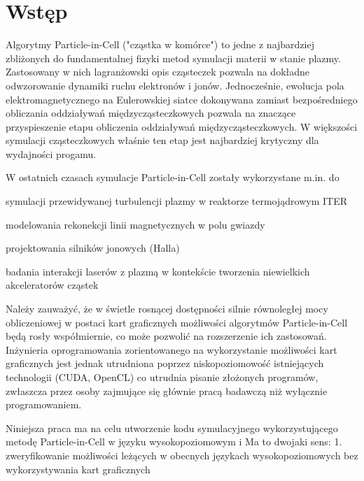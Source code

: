 \section{Wstęp} %
Algorytmy Particle-in-Cell ("cząstka w komórce") to jedne z najbardziej zbliżonych do fundamentalnej fizyki
metod symulacji materii w stanie plazmy. Zastosowany w nich lagranżowski opis cząsteczek pozwala na dokładne
odwzorowanie dynamiki ruchu elektronów i jonów. Jednocześnie, ewolucja pola elektromagnetycznego na Eulerowskiej
siatce dokonywana zamiast bezpośredniego obliczania oddziaływań międzycząsteczkowych pozwala na znaczące
przyspieszenie etapu obliczenia oddziaływań międzycząsteczkowych. W większości symulacji cząsteczkowych właśnie
ten etap jest najbardziej krytyczny dla wydajności progamu.

W ostatnich czasach symulacje Particle-in-Cell zostały wykorzystane m.in. do
\item symulacji przewidywanej turbulencji plazmy w reaktorze termojądrowym ITER %
\item modelowania rekonekcji linii magnetycznych w polu gwiazdy %
\item projektowania silników jonowych (Halla) %
\item badania interakcji laserów z plazmą w kontekście tworzenia niewielkich akceleratorów cząstek %

Należy zauważyć, że w świetle rosnącej dostępności silnie równoległej mocy obliczeniowej w postaci kart graficznych %
możliwości algorytmów Particle-in-Cell będą rosły współmiernie, co może pozwolić na rozszerzenie ich zastosowań.
Inżynieria oprogramowania zorientowanego na wykorzystanie możliwości kart graficznych jest jednak utrudniona poprzez
niskopoziomowość %
istniejących technologii (CUDA, OpenCL) %
co utrudnia pisanie złożonych programów, zwłaszcza przez osoby zajmujące się głównie pracą badawczą
niż wyłącznie programowaniem. %

Niniejsza praca ma na celu utworzenie kodu symulacyjnego wykorzystującego metodę Particle-in-Cell w języku
wysokopoziomowym i %
Ma to dwojaki sens:
1. zweryfikowanie możliwości leżących w obecnych językach wysokopoziomowych bez wykorzystywania kart graficznych
